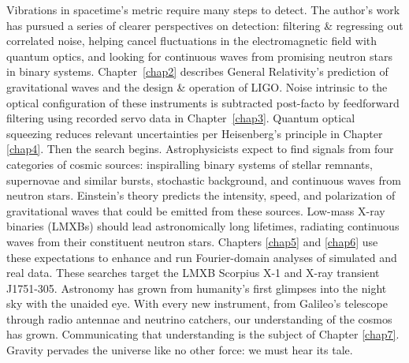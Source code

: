 Vibrations in spacetime's metric require many steps to detect.
The author's work has pursued a series of clearer perspectives on detection: filtering \& regressing out correlated noise, helping cancel fluctuations in the electromagnetic field with quantum optics, and looking for continuous waves from promising neutron stars in binary systems. 
Chapter~\ref{chap2} describes General Relativity's prediction of gravitational waves and the design \& operation of LIGO.
Noise intrinsic to the optical configuration of these instruments is subtracted post-facto by feedforward filtering using recorded servo data in Chapter~\ref{chap3}. 
Quantum optical squeezing reduces relevant uncertainties per Heisenberg's principle in Chapter \ref{chap4}.
Then the search begins.
Astrophysicists expect to find signals from four categories of cosmic sources: inspiralling binary systems of stellar remnants, supernovae and similar bursts, stochastic background, and continuous waves from neutron stars.
Einstein's theory predicts the intensity, speed, and polarization of gravitational waves that could be emitted from these sources.
Low-mass X-ray binaries (LMXBs) should lead astronomically long lifetimes, radiating continuous waves from their constituent neutron stars.
Chapters \ref{chap5} and \ref{chap6} use these expectations to enhance and run Fourier-domain analyses of simulated and real data.
These searches target the LMXB Scorpius X-1 and X-ray transient J1751-305.
Astronomy has grown from humanity's first glimpses into the night sky with the unaided eye. 
With every new instrument, from Galileo's telescope through radio antennae and neutrino catchers, our understanding of the cosmos has grown. 
Communicating that understanding is the subject of Chapter \ref{chap7}.
Gravity pervades the universe like no other force: we must hear its tale. 
        

            
%

